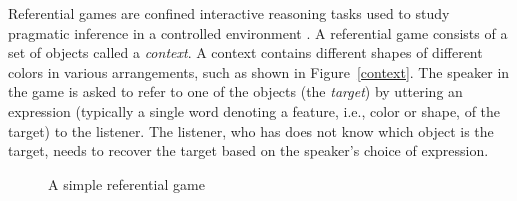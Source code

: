 Referential games are confined interactive reasoning tasks used to
study pragmatic inference in a controlled environment \cite{Frank}. A
referential game consists of a set of objects called a
\textit{context}. A context contains different shapes of different
colors in various arrangements, such as shown in Figure~\ref{context}.
The speaker in the game is asked to refer to one of the objects (the
\emph{target}) by uttering an expression (typically a single word
denoting a feature, i.e., color or shape, of the target) to the
listener. The listener, who has does not know which object is the
target, needs to recover the target based on the speaker's choice of
expression.

\begin{figure}[h] 
  \centering {}\hspace{5mm} 
  \caption{A simple referential game}
\end{figure}


